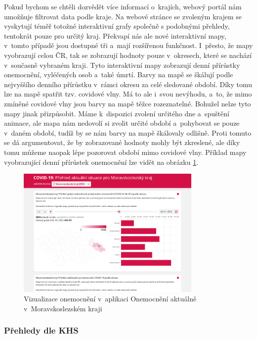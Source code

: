 Pokud bychom se chtěli dozvědět více informací o~krajích, webový portál nám umožňuje filtrovat data podle kraje. Na webové stránce se zvoleným krajem se vyskytují téměř totožné interaktivní grafy společně s podobnými přehledy, tentokrát pouze pro určitý kraj. Překvapí nás ale nové interaktivní mapy, v~tomto případě jsou dostupné tři a~mají rozšířenou funkčnost. I~přesto, že mapy vyobrazují celou ČR, tak se zobrazují hodnoty pouze v~okresech, které se nachází v~současně vybraném kraji. Tyto interaktivní mapy zobrazují denní přírůstky onemocnění, vyléčených osob a~také úmrtí. Barvy na mapě se škálují podle nejvyššího denního přírůstku v~rámci okresu za celé sledované období. Díky tomu lze na mapě spatřit tzv. covidové vlny. Má to ale i~svou nevýhodu, a~to, že mimo zmíněné covidové vlny jsou barvy na mapě těžce rozeznatelné. Bohužel nelze tyto mapy jinak přizpůsobit. Máme k~dispozici zvolení určitého dne a~spuštění animace, ale mapa nám nedovolí si zvolit určité období a~pohybovat se pouze v~daném období, tudíž by se nám barvy na mapě škálovaly odlišně. Proti tomuto se dá argumentovat, že by zobrazované hodnoty mohly být zkreslené, ale díky tomu můžeme naopak lépe pozorovat období mimo covidové vlny. Příklad mapy vyobrazující denní přírůstek onemocnění lze vidět na obrázku \ref{fig:OnemocneniAktualneScreen}.

\begin{figure}
	\centering
	\includegraphics[width=0.8\textwidth]{Pictures/onemocneni-aktualne-screen.png}
	\caption{Vizualizace onemocnění v~aplikaci Onemocnění aktuálně v~Moravskoslezském kraji\cite{onemocneni-aktualne-msk}}
	\label{fig:OnemocneniAktualneScreen}
\end{figure}

\subsubsection*{Přehledy dle KHS}

